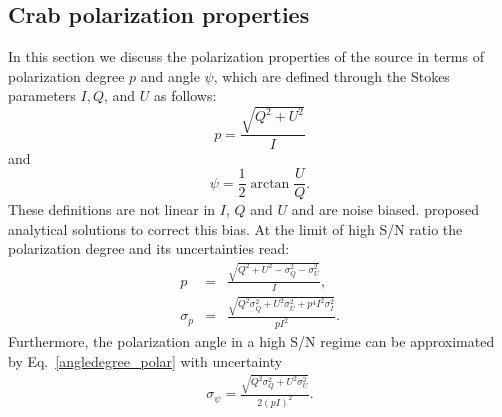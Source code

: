 \documentclass[twocolumn,traditabstract]{aa}
\begin{document}



\subsection{Crab polarization properties}\label{sec:pol_properties}
In this section we discuss the polarization properties of the source in terms of polarization degree $p$ and angle $\psi$, which are defined through the Stokes parameters $I, Q$, and $U$ as follows:
\begin{equation}
 p    = \frac{\sqrt{Q^2 + U^2}}{I} \nonumber 
\end{equation}
and
 \begin{equation}
 \psi = \frac{1}{2}\arctan\frac{U}{Q}.\label{angledegree_polar}
 \end{equation}
These definitions are not linear in $I$, $Q$ and $U$ and are noise biased. 
\citet{1980A&A....91...97S,1985A&A...142..100S,montier} proposed analytical solutions to correct this bias. At the limit of high S/N ratio the polarization degree and its uncertainties read:
 \begin{eqnarray}
 p    &=& \frac{\sqrt{Q^2 + U^2 - \sigma_{Q}^2 - \sigma_{U}^2}}{I}, \nonumber \\ 
  \sigma_{p} &=& \frac{\sqrt{Q^2\sigma_Q^2 + U^2\sigma_U^2 + p^4I^2\sigma_I^2}}{pI^2}.
  \label{p_true_degree}
 \end{eqnarray}
 Furthermore, the polarization angle in a high S/N regime can be approximated by Eq.~\ref{angledegree_polar} with uncertainty
  \begin{eqnarray}\label{angle_uncertainty}
  \sigma_{\psi} = \frac{\sqrt{Q^2\sigma_Q^2 + U^2\sigma_U^2}}{2(pI)^2}.
  \end{eqnarray}
\end{document}
